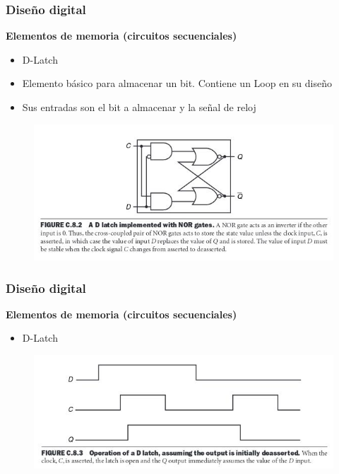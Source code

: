 \documentclass[aspectratio=169,compress]{beamer}
\begin{document}
\begin{footnotesize}
\begin{frame}[fragile]
\frametitle{Diseño digital}
\begin{center}\textbf{Elementos de memoria (circuitos secuenciales)}\end{center}
\begin{itemize}
\item D-Latch
\item Elemento básico para almacenar un bit. Contiene un Loop en su diseño
\item Sus entradas son el bit a almacenar y la señal de reloj
\end{itemize}
\begin{figure}
\includegraphics[scale=0.4]{images/latch-d.jpg} 
\end{figure}
\end{frame}


\begin{frame}[fragile]
\frametitle{Diseño digital}
\begin{center}\textbf{Elementos de memoria (circuitos secuenciales)}\end{center}
\begin{itemize}
\item D-Latch
\end{itemize}
\begin{figure}
\includegraphics[scale=0.4]{images/latch-d-tiempo.jpg} 
\end{figure}
\end{frame}



\end{footnotesize}
\end{document}

